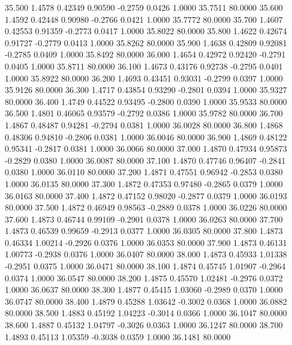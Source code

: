   35.500   1.4578   0.42349   0.90590  -0.2759   0.0426   1.0000  35.7511  80.0000
  35.600   1.4592   0.42448   0.90980  -0.2766   0.0421   1.0000  35.7772  80.0000
  35.700   1.4607   0.42553   0.91359  -0.2773   0.0417   1.0000  35.8022  80.0000
  35.800   1.4622   0.42674   0.91727  -0.2779   0.0413   1.0000  35.8262  80.0000
  35.900   1.4638   0.42809   0.92081  -0.2785   0.0409   1.0000  35.8492  80.0000
  36.000   1.4654   0.42972   0.92420  -0.2791   0.0405   1.0000  35.8711  80.0000
  36.100   1.4673   0.43176   0.92738  -0.2795   0.0401   1.0000  35.8922  80.0000
  36.200   1.4693   0.43451   0.93031  -0.2799   0.0397   1.0000  35.9126  80.0000
  36.300   1.4717   0.43854   0.93290  -0.2801   0.0394   1.0000  35.9327  80.0000
  36.400   1.4749   0.44522   0.93495  -0.2800   0.0390   1.0000  35.9533  80.0000
  36.500   1.4801   0.46065   0.93579  -0.2792   0.0386   1.0000  35.9782  80.0000
  36.700   1.4867   0.48487   0.94281  -0.2794   0.0381   1.0000  36.0028  80.0000
  36.800   1.4868   0.48306   0.94810  -0.2806   0.0381   1.0000  36.0046  80.0000
  36.900   1.4869   0.48122   0.95341  -0.2817   0.0381   1.0000  36.0066  80.0000
  37.000   1.4870   0.47934   0.95873  -0.2829   0.0380   1.0000  36.0087  80.0000
  37.100   1.4870   0.47746   0.96407  -0.2841   0.0380   1.0000  36.0110  80.0000
  37.200   1.4871   0.47551   0.96942  -0.2853   0.0380   1.0000  36.0135  80.0000
  37.300   1.4872   0.47353   0.97480  -0.2865   0.0379   1.0000  36.0163  80.0000
  37.400   1.4872   0.47152   0.98020  -0.2877   0.0379   1.0000  36.0193  80.0000
  37.500   1.4872   0.46949   0.98563  -0.2889   0.0378   1.0000  36.0226  80.0000
  37.600   1.4873   0.46744   0.99109  -0.2901   0.0378   1.0000  36.0263  80.0000
  37.700   1.4873   0.46539   0.99659  -0.2913   0.0377   1.0000  36.0305  80.0000
  37.800   1.4873   0.46334   1.00214  -0.2926   0.0376   1.0000  36.0353  80.0000
  37.900   1.4873   0.46131   1.00773  -0.2938   0.0376   1.0000  36.0407  80.0000
  38.000   1.4873   0.45933   1.01338  -0.2951   0.0375   1.0000  36.0471  80.0000
  38.100   1.4874   0.45745   1.01907  -0.2964   0.0374   1.0000  36.0547  80.0000
  38.200   1.4875   0.45570   1.02481  -0.2976   0.0372   1.0000  36.0637  80.0000
  38.300   1.4877   0.45415   1.03060  -0.2989   0.0370   1.0000  36.0747  80.0000
  38.400   1.4879   0.45288   1.03642  -0.3002   0.0368   1.0000  36.0882  80.0000
  38.500   1.4883   0.45192   1.04223  -0.3014   0.0366   1.0000  36.1047  80.0000
  38.600   1.4887   0.45132   1.04797  -0.3026   0.0363   1.0000  36.1247  80.0000
  38.700   1.4893   0.45113   1.05359  -0.3038   0.0359   1.0000  36.1481  80.0000
